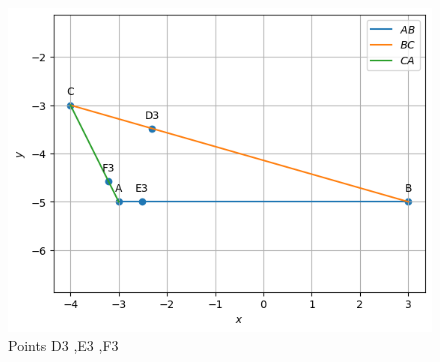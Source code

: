 \documentclass[11pt]{book}
\begin{document}
\begin{enumerate}[label=\thesection.\arabic*.,ref=\thesection.\theenumi]
\begin{figure}[H]
    \includegraphics{figs/Ang_bisect1.png}
    \caption{Points D3 ,E3 ,F3}
    \label{fig:Ang_bisect1}
\end{figure}


\end{enumerate}
\end{document}
